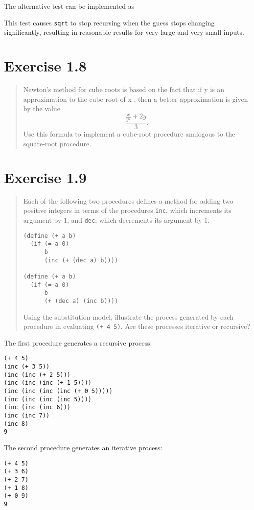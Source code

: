 \documentclass{article}
\begin{document}
The alternative test can be implemented as


This test causes \verb|sqrt| to stop recursing when the guess stops changing
significantly, resulting in reasonable results for very large and very small
inputs.

\section{Exercise 1.8}
\begin{quote}
    Newton’s method for cube roots is based on the fact that if y is an
    approximation to the cube root of x , then a better approximation is given
    by the value $$\frac{\frac{x}{y^2} + 2y}{3}.$$  Use this formula to
    implement a cube-root procedure analogous to the square-root procedure.
\end{quote}



\section{Exercise 1.9}
\begin{quote}
    Each of the following two procedures defines a method for adding two
    positive integers in terms of the procedures \verb|inc|, which increments
    its argument by 1, and \verb|dec|, which decrements its argument by 1.
    \begin{lstlisting}
(define (+ a b)
  (if (= a 0)
      b
      (inc (+ (dec a) b))))

(define (+ a b)
  (if (= a 0)
      b
      (+ (dec a) (inc b))))
    \end{lstlisting}
    Using the substitution model, illustrate the process generated by each
    procedure in evaluating \verb|(+ 4 5)|. Are these processes iterative or
    recursive?
\end{quote}

The first procedure generates a recursive process:
\begin{verbatim}
(+ 4 5)
(inc (+ 3 5))
(inc (inc (+ 2 5)))
(inc (inc (inc (+ 1 5))))
(inc (inc (inc (inc (+ 0 5)))))
(inc (inc (inc (inc 5))))
(inc (inc (inc 6)))
(inc (inc 7))
(inc 8)
9
\end{verbatim}

The second procedure generates an iterative process:
\begin{verbatim}
(+ 4 5)
(+ 3 6)
(+ 2 7)
(+ 1 8)
(+ 0 9)
9
\end{verbatim}
\end{document}
